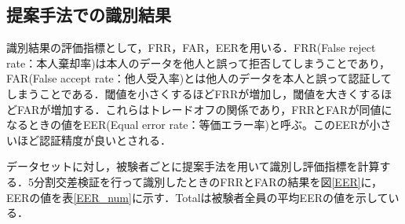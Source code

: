 \documentclass[Japanese,noauthor]{dicomopapers}
\begin{document}
\subsection{提案手法での識別結果}
識別結果の評価指標として，FRR，FAR，EERを用いる．FRR(False reject rate：本人棄却率)は本人のデータを他人と誤って拒否してしまうことであり，FAR(False accept rate：他人受入率)とは他人のデータを本人と誤って認証してしまうことである．閾値を小さくするほどFRRが増加し，閾値を大きくするほどFARが増加する．これらはトレードオフの関係であり，FRRとFARが同値になるときの値をEER(Equal error rate：等価エラー率)と呼ぶ。このEERが小さいほど認証精度が良いとされる．\par
データセットに対し，被験者ごとに提案手法を用いて識別し評価指標を計算する．5分割交差検証を行って識別したときのFRRとFARの結果を図\ref{EER}に，EERの値を表\ref{EER_num}に示す．Totalは被験者全員の平均EERの値を示している．
\end{document}
